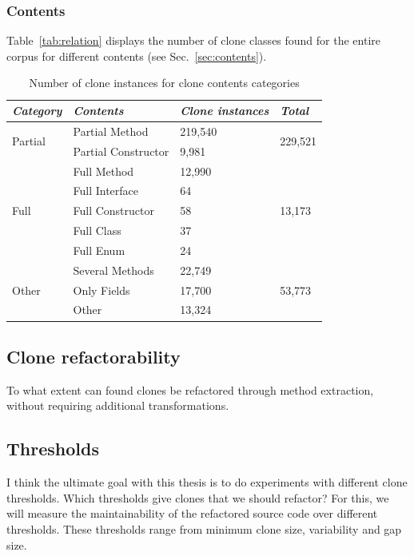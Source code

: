 \documentclass[sigconf,review]{acmart}
\begin{document}
\subsubsection{Contents}
Table~\ref{tab:relation} displays the number of clone classes found for the entire corpus for different contents (see Sec.~\ref{sec:contents}).

\begin{table}[]
\centering
\begin{tabular}{@{}llll@{}}
\toprule
\textit{\textbf{Category}} & \textit{\textbf{Contents}} & \textit{\textbf{Clone instances}} & \textit{\textbf{Total}} \\ \midrule
\multirow{2}{*}{Partial} & Partial Method & 219,540 & \multirow{2}{*}{229,521} \\ \cmidrule(lr){2-3}
 & Partial Constructor & 9,981 &  \\ \midrule
\multirow{5}{*}{Full} & Full Method & 12,990 & \multirow{5}{*}{13,173} \\ \cmidrule(lr){2-3}
 & Full Interface & 64 &  \\ \cmidrule(lr){2-3}
 & Full Constructor & 58 &  \\ \cmidrule(lr){2-3}
 & Full Class & 37 &  \\ \cmidrule(lr){2-3}
 & Full Enum & 24 &  \\ \midrule
\multirow{3}{*}{Other} & Several Methods & 22,749 & \multirow{3}{*}{53,773} \\ \cmidrule(lr){2-3}
 & Only Fields & 17,700 &  \\ \cmidrule(lr){2-3}
 & Other & 13,324 &  \\ \bottomrule
\end{tabular}
\caption{Number of clone instances for clone contents categories}
\label{tab:contents}
\end{table}

\subsection{Clone refactorability}
To what extent can found clones be refactored through method extraction, without requiring additional transformations.

\subsection{Thresholds}
I think the ultimate goal with this thesis is to do experiments with different clone thresholds. Which thresholds give clones that we should refactor? For this, we will measure the maintainability of the refactored source code over different thresholds. These thresholds range from minimum clone size, variability and gap size.
\end{document}
